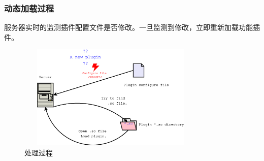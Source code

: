 \documentclass[10pt,dvipdfm]{beamer}
\begin{document}
\begin{frame}
	\frametitle{动态加载过程}
	
	服务器实时的监测插件配置文件是否修改。一旦监测到修改，立即重新加载功能插件。

	\begin{figure}[htbp]
	\centering
	\includegraphics[height=5cm, width=9cm]{pics/loadplugin.eps}
	\caption{处理过程}
	\end{figure}

\end{frame}
\end{document}

